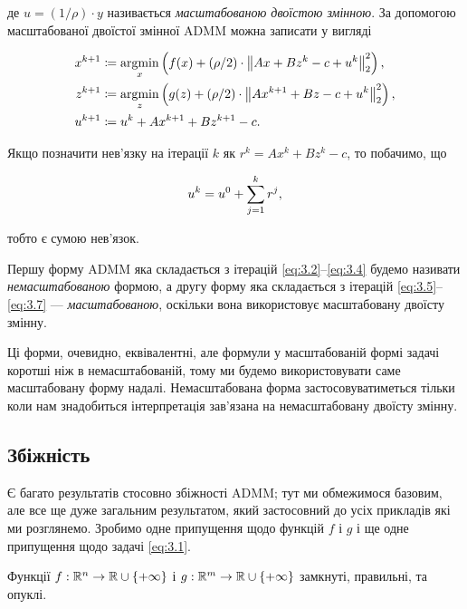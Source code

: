 де $u = (1 / \rho) \cdot y$ називається \textit{масштабованою двоїстою змінною}. За допомогою масштабованої двоїстої змінної ADMM можна записати у вигляді

\begin{align}
	\label{eq:3.5}
	x^{k + 1} &\coloneqq \operatorname*{argmin}_x \left( f(x) + (\rho / 2) \cdot \left\| A x + B z^k - c + u^k \right\|_2^2 \right), \\
	\label{eq:3.6}
	z^{k + 1} &\coloneqq \operatorname*{argmin}_z \left( g(z) + (\rho / 2) \cdot \left\| A x^{k + 1} + B z - c + u^k \right\|_2^2 \right), \\
	\label{eq:3.7}
	u^{k + 1} &\coloneqq u^k + A x^{k + 1} + B z^{k + 1} - c.
\end{align}

Якщо позначити нев'язку на ітерації $k$ як $r^k = A x^k + B z^k - c$, то побачимо, що

\begin{equation}
	u^k = u^0 + \operatorname*{\sum}_{j = 1}^k r^j,
\end{equation}

тобто є сумою нев'язок.

\begin{definition}
    Першу форму ADMM яка складається з ітерацій \eqref{eq:3.2}--\eqref{eq:3.4} будемо називати \textit{немасштабованою} формою, а другу форму яка складається з ітерацій \eqref{eq:3.5}--\eqref{eq:3.7} --- \textit{масштабованою}, оскільки вона використовує масштабовану двоїсту змінну.
\end{definition}

Ці форми, очевидно, еквівалентні, але формули у масштабованій формі задачі коротші ніж в немасштабованій, тому ми будемо використовувати саме масштабовану форму надалі. Немасштабована форма застосовуватиметься тільки коли нам знадобиться інтерпретація зав'язана на немасштабовану двоїсту змінну.

\subsection{Збіжність}

Є багато результатів стосовно збіжності ADMM; тут ми обмежимося базовим, але все ще дуже загальним результатом, який застосовний до усіх прикладів які ми розглянемо. Зробимо одне припущення щодо функцій $f$ і $g$ і ще одне припущення щодо задачі \eqref{eq:3.1}.

\begin{assumption}
	Функції $f: \mathbb{R}^n \to \mathbb{R} \cup \{ + \infty \}$ і $g: \mathbb{R}^m \to \mathbb{R} \cup \{ + \infty \}$ замкнуті, правильні, та опуклі.
\end{assumption}


